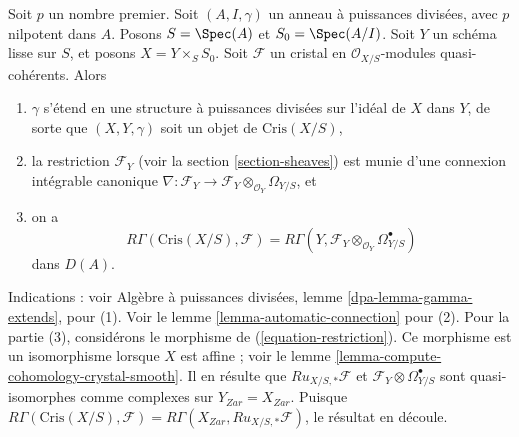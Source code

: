 \begin{remark}[Comparaison]
\label{remark-comparison}
Soit $p$ un nombre premier. Soit $(A, I, \gamma)$ un anneau à puissances
divisées, avec $p$ nilpotent dans $A$. Posons $S = \Spec(A)$ et
$S_0 = \Spec(A/I)$. Soit $Y$ un schéma lisse sur $S$, et posons
$X = Y \times_S S_0$. Soit
$\mathcal{F}$ un cristal en $\mathcal{O}_{X/S}$-modules quasi-cohérents.
Alors
\begin{enumerate}
\item $\gamma$ s'étend en une structure à puissances divisées sur l'idéal
de $X$ dans $Y$, de sorte que $(X, Y, \gamma)$ soit un objet de $\text{Cris}(X/S)$,
\item la restriction $\mathcal{F}_Y$ (voir la section \ref{section-sheaves})
est munie d'une connexion intégrable canonique
$\nabla : \mathcal{F}_Y \to
\mathcal{F}_Y \otimes_{\mathcal{O}_Y} \Omega_{Y/S}$, et
\item on a
$$
R\Gamma(\text{Cris}(X/S), \mathcal{F}) =
R\Gamma(Y, \mathcal{F}_Y \otimes_{\mathcal{O}_Y} \Omega^\bullet_{Y/S})
$$
dans $D(A)$.
\end{enumerate}
Indications : voir Algèbre à puissances divisées, lemme \ref{dpa-lemma-gamma-extends}, pour (1).
Voir le lemme \ref{lemma-automatic-connection} pour (2).
Pour la partie (3), considérons le morphisme de
(\ref{equation-restriction}). Ce morphisme est un isomorphisme lorsque
$X$ est affine ; voir le
lemme \ref{lemma-compute-cohomology-crystal-smooth}.
Il en résulte que $Ru_{X/S, *}\mathcal{F}$ et
$\mathcal{F}_Y \otimes \Omega^\bullet_{Y/S}$ sont quasi-isomorphes
comme complexes sur $Y_{Zar} = X_{Zar}$.
Puisque $R\Gamma(\text{Cris}(X/S), \mathcal{F}) =
R\Gamma(X_{Zar}, Ru_{X/S, *}\mathcal{F})$, le résultat en découle.
\end{remark}

